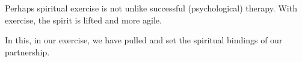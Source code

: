 

Perhaps spiritual exercise is not unlike successful (psychological)
therapy.  With exercise, the spirit is \break lifted and more agile.

In this, in our exercise, we have pulled and set the spiritual
bindings of our partnership.

\bye
